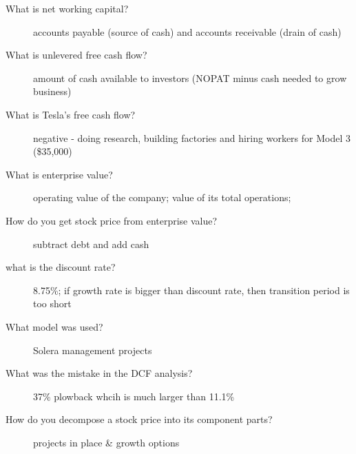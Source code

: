 \documentclass[11pt]{article}
\begin{document}
\begin{description}
\item[What is net working capital?]
  accounts payable (source of cash) and accounts receivable (drain of cash)
\item[What is unlevered free cash flow?]
  amount of cash available to investors (NOPAT minus cash needed to grow business)
\item[What is Tesla's free cash flow?]
  negative - doing research, building factories and hiring workers for Model 3 (\$35,000)
\item[What is enterprise value?]
  operating value of the company;
  value of its total operations;
\item[How do you get stock price from enterprise value?]
  subtract debt and add cash
\item[what is the discount rate?]
  8.75\%;
  if growth rate is bigger than discount rate, then transition period is too short
\item[What model was used?]
  Solera management projects
\item[What was the mistake in the DCF analysis?]
  37\% plowback whcih is much larger than 11.1\%
\item[How do you decompose a stock price into its component parts?]
  projects in place \& growth options
\end{description}
\end{document}
